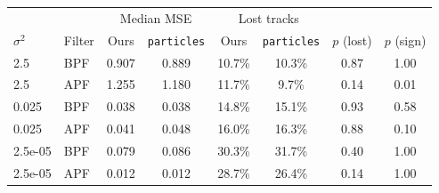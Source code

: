 \begin{tabular}{llcccccc}
\toprule
 & & \multicolumn{2}{c}{Median MSE} & \multicolumn{2}{c}{Lost tracks} & & \\
$\sigma^2$ & Filter & Ours & \texttt{particles} & Ours & \texttt{particles} & $p$ (lost) & $p$ (sign) \\
\midrule
2.5 & BPF & 0.907 & 0.889 & 10.7\% & 10.3\% & 0.87 & 1.00 \\
2.5 & APF & 1.255 & 1.180 & 11.7\% & 9.7\% & 0.14 & 0.01 \\
0.025 & BPF & 0.038 & 0.038 & 14.8\% & 15.1\% & 0.93 & 0.58 \\
0.025 & APF & 0.041 & 0.048 & 16.0\% & 16.3\% & 0.88 & 0.10 \\
2.5e-05 & BPF & 0.079 & 0.086 & 30.3\% & 31.7\% & 0.40 & 1.00 \\
2.5e-05 & APF & 0.012 & 0.012 & 28.7\% & 26.4\% & 0.14 & 1.00 \\
\bottomrule
\end{tabular}
